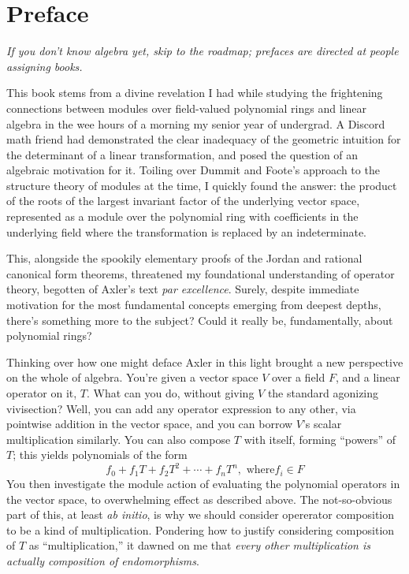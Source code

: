 \chapter*{Preface}

\textit{If you don't know algebra yet, skip to the roadmap; prefaces are directed at people assigning books.}
\vspace{20pt}

This book stems from a divine revelation I had while studying the frightening connections
between modules over field-valued polynomial rings and linear algebra in the wee hours of a morning my senior year of undergrad.
A Discord math friend had demonstrated the clear inadequacy of the geometric intuition for the determinant of a linear transformation,
and posed the question of an algebraic motivation for it.
Toiling over Dummit and Foote's approach to the structure theory of modules at the time, I quickly found the answer:
the product of the roots of the largest invariant factor of the underlying vector space, represented as a module over the polynomial ring
with coefficients in the underlying field where the transformation is replaced by an indeterminate.

This, alongside the spookily elementary proofs of the Jordan and rational canonical form theorems,
threatened my foundational understanding of operator theory, begotten of Axler's text \textit{par excellence}.
Surely, despite immediate motivation for the most fundamental concepts emerging from deepest depths, there's something more to the subject?
Could it really be, fundamentally, about polynomial rings?

Thinking over how one might deface Axler in this light brought a new perspective on the whole of algebra.
You're given a vector space $V$ over a field $F$, and a linear operator on it, $T$.
What can you do, without giving $V$ the standard agonizing vivisection?
Well, you can add any operator expression to any other, via pointwise addition in the vector space,
and you can borrow $V$'s scalar multiplication similarly.
You can also compose $T$ with itself, forming ``powers'' of $T$; this yields polynomials of the form
\[
  f_{0} + f_{1}T + f_{2}T^{2} + \cdots + f_{n}T^{n}, \text{ where} f_{i} \in F
\]
You then investigate the module action of evaluating the polynomial operators in the vector space, to overwhelming effect as described above.
The not-so-obvious part of this, at least \textit{ab initio}, is why we should consider opererator composition to be a kind of multiplication.
Pondering how to justify considering composition of $T$ as ``multiplication,'' it dawned on me that
\textit{every other multiplication is actually composition of endomorphisms}.

